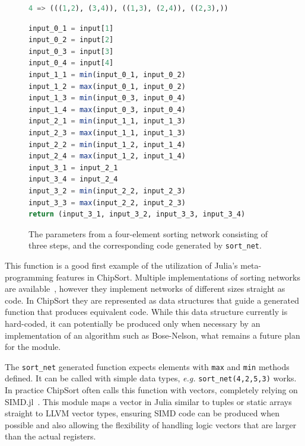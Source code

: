 \documentclass{juliacon}
\begin{document}
\begin{figure}[htb]
\begin{lstlisting}[language = Julia]
4 => (((1,2), (3,4)), ((1,3), (2,4)), ((2,3),))
\end{lstlisting}
\begin{lstlisting}[language = Julia]
input_0_1 = input[1]
input_0_2 = input[2]
input_0_3 = input[3]
input_0_4 = input[4]
input_1_1 = min(input_0_1, input_0_2)
input_1_2 = max(input_0_1, input_0_2)
input_1_3 = min(input_0_3, input_0_4)
input_1_4 = max(input_0_3, input_0_4)
input_2_1 = min(input_1_1, input_1_3)
input_2_3 = max(input_1_1, input_1_3)
input_2_2 = min(input_1_2, input_1_4)
input_2_4 = max(input_1_2, input_1_4)
input_3_1 = input_2_1
input_3_4 = input_2_4
input_3_2 = min(input_2_2, input_2_3)
input_3_3 = max(input_2_2, input_2_3)
return (input_3_1, input_3_2, input_3_3, input_3_4)
\end{lstlisting}
\caption{The parameters from a four-element sorting network consisting of three steps, and the corresponding code generated by {\tt sort\_net}.}
\label{fig:sort-net-listing}
\end{figure}

This function is a good first example of the utilization of Julia's meta-programming features in ChipSort. Multiple implementations of sorting networks are available~\cite{DBLP:journals/pvldb/ChhuganiNLMHCBKD08,sortingnetworksjl,ultrasort}, however they implement networks of different sizes straight as code. In ChipSort they are represented as data structures that guide a generated function that produces equivalent code. While this data structure currently is hard-coded, it can potentially be produced only when necessary by an implementation of an algorithm such as Bose-Nelson, what remains a future plan for the module.

The {\tt sort\_net} generated function expects elements with {\tt max} and {\tt min} methods defined. It can be called with simple data types, {\em e.g.} {\tt sort\_net(4,2,5,3)} works. In practice ChipSort often calls this function with vectors, completely relying on SIMD.jl~\cite{erik_schnetter_2019_2592633}. This module maps a vector in Julia similar to tuples or static arrays straight to LLVM vector types, ensuring SIMD code can be produced when possible and also allowing the flexibility of handling logic vectors that are larger than the actual registers.
\end{document}
